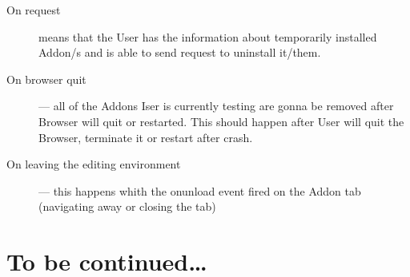 \documentclass[10pt]{article}
\begin{document}
			\begin{description}
				\item[On request] means that the User has the information about temporarily installed Addon/s 
					and is able to send request to uninstall it/them.
				\item[On browser quit] --- all of the Addons Iser is currently testing are gonna be removed 
					after Browser will quit or restarted. This should happen after User will quit the Browser,
					terminate it or restart after crash.
				\item[On leaving the editing environment] --- this happens whith the onunload event fired 
					on the Addon tab (navigating away or closing the tab)
			\end{description}
	
		
	
	
\pagebreak
\section*{To be continued\ldots}
\end{document}
